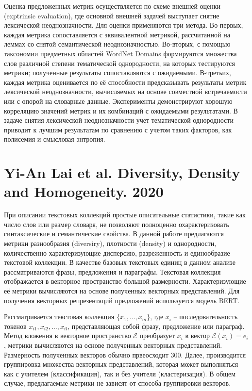 Оценка предложенных метрик осуществляется по схеме внешней оценки (exptrinsic evaluation), где основной внешней задачей выступает снятие лексической неоднозначности. Для оценки применяются три метода. Во-первых, каждая метрика сопоставляется с эквивалентной метрикой, рассчитанной на леммах со снятой семантической неоднозначностью. Во-вторых, с помощью таксономии предметных областей WordNet Domains формируются множества слов различной степени тематической однородности, на которых тестируются метрики; полученные результаты сопоставляются с ожидаемыми. В-третьих, каждая метрика оценивается по её способности предсказывать результаты метрик лексической неоднозначности, вычисляемых на основе совместной встречаемости или с опорой на словарные данные. Эксперименты демонстрируют хорошую корреляцию значений метрик и их комбинаций с ожидаемыми результатами. В задаче снятия лексической неоднозначности учет тематической однородности приводит к лучшим результатам по сравнению с учетом таких факторов, как полисемия и смысловая энтропия.



\section{Yi-An Lai et al. Diversity, Density and Homogeneity. 2020}

При описании текстовых коллекций простые описательные статистики, такие как число слов или размер словаря, не позволяют полноценно охарактеризовать синтаксические и семантические свойства. В данной работе предлагаются метрики разнообразия (diversiry), плотности (density) и однородности, количественно характеризующие дисперсию, разреженность и единообразие текстовой коллекции. В качестве базовых текстовых единиц в данном анализе рассматриваются фразы, предложения и параграфы. Текстовая коллекция отображается в векторное пространство большой размерности. Характеризующие её метрики вычисляются на основе полученных векторных представлений. Для получения векторных репрезентаций предложений используется модель BERT. 

Рассматривается текстовая коллекция $\{x_1, \ldots, x_m\}$, где $x_i$ -- последовательность токенов $x_{i1}, x_{i2}, \ldots, x_{il}$, представляющая собой фразу, предложение или параграф. Метод вложения в векторное пространство $\mathcal{E}$ преобразует $x_i$ в вектор $\mathcal{E}(x_i) = e_i$, метрики вычисляются на основе полученных векторных представлений. Размерность полученных векторов обычно првеосходит 300. Далее, производится группировка множества векторных представлений, которая может выполняться как с учителем (классификация), так и без учителя (кластеризация). В общем случае, предлагаемые метрики не зависят от способа группировки векторов.

